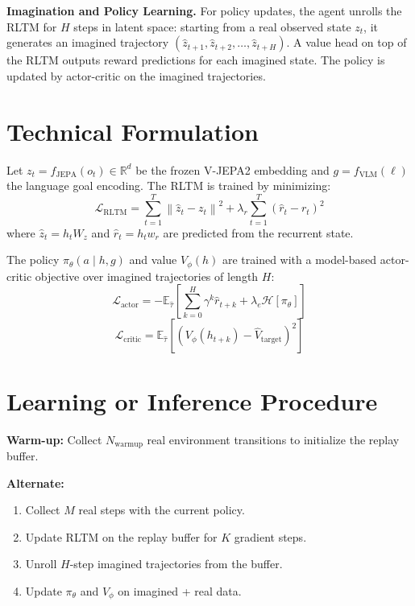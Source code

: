 \documentclass[10pt,twocolumn]{article}
\begin{document}
\textbf{Imagination and Policy Learning.} For policy updates, the
agent unrolls the RLTM for $H$ steps in latent space: starting from
a real observed state $z_t$, it generates an imagined trajectory
$(\hat{z}_{t+1}, \hat{z}_{t+2}, \ldots, \hat{z}_{t+H})$.
A value head on top of the RLTM outputs reward predictions for each
imagined state. The policy is updated by actor-critic on the
imagined trajectories.

\section{Technical Formulation}

Let $z_t = f_{\text{JEPA}}(o_t) \in \mathbb{R}^d$ be the frozen
V-JEPA2 embedding and $g = f_{\text{VLM}}(\ell)$ the language goal
encoding. The RLTM is trained by minimizing:
\[
\mathcal{L}_{\text{RLTM}} = \sum_{t=1}^{T} \left\|
  \hat{z}_t - z_t \right\|^2
  + \lambda_r \sum_{t=1}^{T} \left(\hat{r}_t - r_t\right)^2
\]
where $\hat{z}_t = h_t W_z$ and $\hat{r}_t = h_t w_r$ are
predicted from the recurrent state.

The policy $\pi_\theta(a \mid h, g)$ and value $V_\phi(h)$ are
trained with a model-based actor-critic objective over imagined
trajectories of length $H$:
\[
\mathcal{L}_{\text{actor}} = -\mathbb{E}_{\hat{\tau}}\!
  \left[\sum_{k=0}^{H} \gamma^k \hat{r}_{t+k}
  + \lambda_e \mathcal{H}[\pi_\theta]\right]
\]
\[
\mathcal{L}_{\text{critic}} = \mathbb{E}_{\hat{\tau}}\!
  \left[\left(V_\phi(h_{t+k}) - \hat{V}_{\text{target}}\right)^2\right]
\]

\section{Learning or Inference Procedure}

\textbf{Warm-up:} Collect $N_{\text{warmup}}$ real environment
transitions to initialize the replay buffer.

\textbf{Alternate:}
\begin{enumerate}[itemsep=2pt,parsep=0pt]
  \item Collect $M$ real steps with the current policy.
  \item Update RLTM on the replay buffer for $K$ gradient steps.
  \item Unroll $H$-step imagined trajectories from the buffer.
  \item Update $\pi_\theta$ and $V_\phi$ on imagined + real data.
\end{enumerate}
\end{document}
